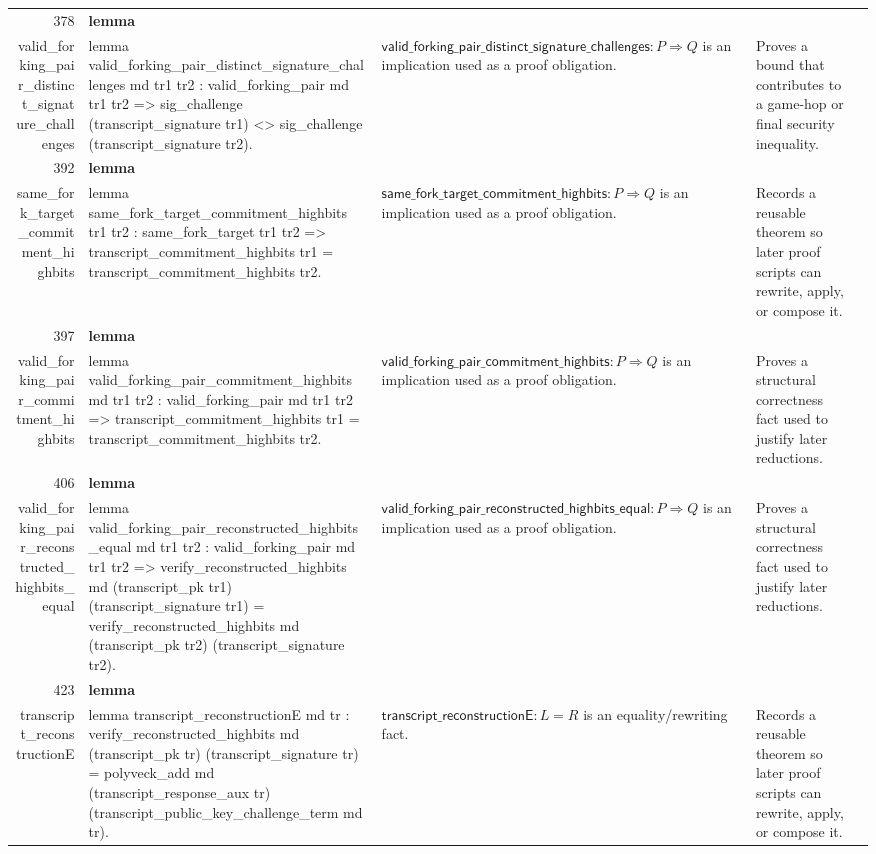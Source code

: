 \documentclass[10pt]{article}
\newcommand{\ec}[1]{\begingroup\ttfamily\scriptsize #1\endgroup}
\begin{document}
\begin{longtable}{r L{0.17\textwidth} L{0.26\textwidth} L{0.27\textwidth} L{0.20\textwidth}}
378 & \textbf{lemma}\\\ec{valid\_forking\_pair\_distinct\_signature\_challenges} & \ec{lemma valid\_forking\_pair\_distinct\_signature\_challenges md tr1 tr2 : valid\_forking\_pair md tr1 tr2 => sig\_challenge (transcript\_signature tr1) <> sig\_challenge (transcript\_signature tr2).} & \(\mathsf{valid\_forking\_pair\_distinct\_signature\_challenges} : P \Rightarrow Q\) is an implication used as a proof obligation. & Proves a bound that contributes to a game-hop or final security inequality. \\
392 & \textbf{lemma}\\\ec{same\_fork\_target\_commitment\_highbits} & \ec{lemma same\_fork\_target\_commitment\_highbits tr1 tr2 : same\_fork\_target tr1 tr2 => transcript\_commitment\_highbits tr1 = transcript\_commitment\_highbits tr2.} & \(\mathsf{same\_fork\_target\_commitment\_highbits} : P \Rightarrow Q\) is an implication used as a proof obligation. & Records a reusable theorem so later proof scripts can rewrite, apply, or compose it. \\
397 & \textbf{lemma}\\\ec{valid\_forking\_pair\_commitment\_highbits} & \ec{lemma valid\_forking\_pair\_commitment\_highbits md tr1 tr2 : valid\_forking\_pair md tr1 tr2 => transcript\_commitment\_highbits tr1 = transcript\_commitment\_highbits tr2.} & \(\mathsf{valid\_forking\_pair\_commitment\_highbits} : P \Rightarrow Q\) is an implication used as a proof obligation. & Proves a structural correctness fact used to justify later reductions. \\
406 & \textbf{lemma}\\\ec{valid\_forking\_pair\_reconstructed\_highbits\_equal} & \ec{lemma valid\_forking\_pair\_reconstructed\_highbits\_equal md tr1 tr2 : valid\_forking\_pair md tr1 tr2 => verify\_reconstructed\_highbits md (transcript\_pk tr1) (transcript\_signature tr1) = verify\_reconstructed\_highbits md (transcript\_pk tr2) (transcript\_signature tr2).} & \(\mathsf{valid\_forking\_pair\_reconstructed\_highbits\_equal} : P \Rightarrow Q\) is an implication used as a proof obligation. & Proves a structural correctness fact used to justify later reductions. \\
423 & \textbf{lemma}\\\ec{transcript\_reconstructionE} & \ec{lemma transcript\_reconstructionE md tr : verify\_reconstructed\_highbits md (transcript\_pk tr) (transcript\_signature tr) = polyveck\_add md (transcript\_response\_aux tr) (transcript\_public\_key\_challenge\_term md tr).} & \(\mathsf{transcript\_reconstructionE} : L = R\) is an equality/rewriting fact. & Records a reusable theorem so later proof scripts can rewrite, apply, or compose it. \\

\end{longtable}
\end{document}

